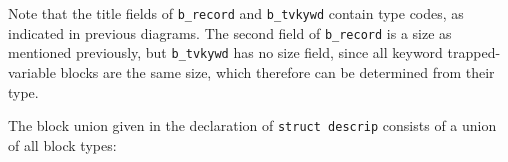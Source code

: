 Note that the title fields of \texttt{b\_record} and
\texttt{b\_tvkywd} contain type codes, as indicated in previous
diagrams. The second field of \texttt{b\_record} is a size as
mentioned previously, but \texttt{b\_tvkywd} has no size field, since
all keyword trapped-variable blocks are the same size, which therefore
can be determined from their type.

The block union given in the declaration of \texttt{struct descrip}
consists of a union of all block types:


